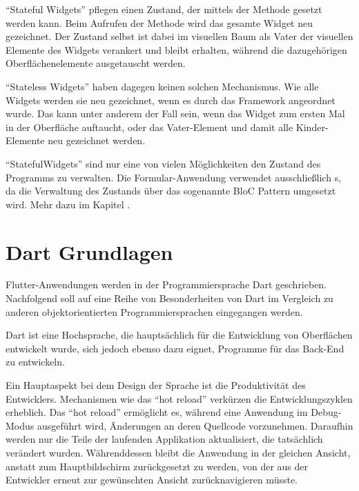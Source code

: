 \enquote{Stateful Widgets} pflegen einen Zustand, der mittels der Methode  gesetzt werden kann.
Beim Aufrufen der Methode wird das gesamte Widget neu gezeichnet.
Der Zustand selbst ist dabei im visuellen Baum als Vater der visuellen Elemente des Widgets verankert und bleibt erhalten, während die dazugehörigen Oberflächenelemente ausgetauscht werden.

\enquote{Stateless Widgets} haben dagegen keinen solchen Mechanismus.
Wie alle Widgets werden sie neu gezeichnet, wenn es durch das Framework angeordnet wurde.
Das kann unter anderem der Fall sein, wenn das Widget zum ersten Mal in der Oberfläche auftaucht, oder das Vater-Element und damit alle Kinder-Elemente neu gezeichnet werden.

\enquote{StatefulWidgets} sind nur eine von vielen Möglichkeiten den Zustand des Programms zu verwalten.
Die Formular-Anwendung verwendet ausschließlich s, da die Verwaltung des Zustands über das sogenannte BloC Pattern umgesetzt wird.
Mehr dazu im Kapitel .


\section{Dart Grundlagen}
\label{sec:Dart-Grundlagen}

Flutter-Anwendungen werden in der Programmiersprache Dart geschrieben.
Nachfolgend soll auf eine Reihe von Besonderheiten von Dart im Vergleich zu anderen objektorientierten Programmiersprachen eingegangen werden.

Dart ist eine Hochsprache, die hauptsächlich für die Entwicklung von Oberflächen entwickelt wurde, sich jedoch ebenso dazu eignet, Programme für das Back-End zu entwickeln.

Ein Hauptaspekt bei dem Design der Sprache ist die Produktivität des Entwicklers.
Mechanismen wie das \enquote{hot reload} verkürzen die Entwicklungszyklen erheblich.
Das \enquote{hot reload} ermöglicht es, während eine Anwendung im Debug-Modus ausgeführt wird, Änderungen an deren Quellcode vorzunehmen.
Daraufhin werden nur die Teile der laufenden Applikation aktualisiert, die tatsächlich verändert wurden.
 Währenddessen bleibt die Anwendung in der gleichen Ansicht, anstatt zum Hauptbildschirm zurückgesetzt zu werden, von der aus der Entwickler erneut zur gewünschten Ansicht zurücknavigieren müsste.


